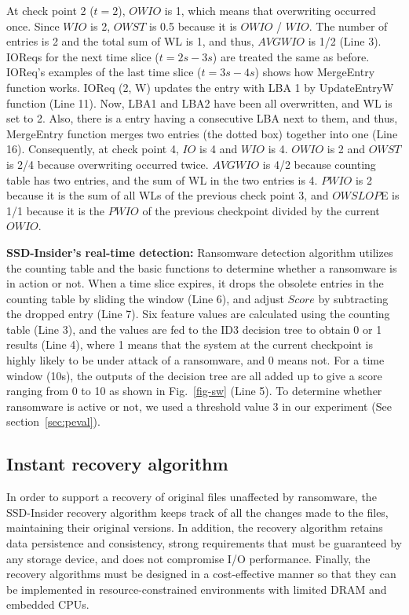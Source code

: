 \documentclass[conference]{IEEEtran}
\newcommand{\ours}{SSD-Insider}
\begin{document}
At check point 2 ($t=2$), $OWIO$ is 1, which means that overwriting occurred once. 
Since $WIO$ is 2, $OWST$ is 0.5 because it is $OWIO$ / $WIO$. 
The number of entries is 2 and the total sum of WL is 1, and thus, $AVGWIO$ is 1/2 (Line 3). 
IOReqs for the next time slice ($t=2s-3s$) are treated the same as before. 
IOReq's examples of the last time slice ($t=3s-4s$) shows how MergeEntry function works.
IOReq (2, W) updates the entry with LBA 1 by UpdateEntryW function (Line 11). 
Now, LBA1 and LBA2 have been all overwritten, and WL is set to 2. 
Also, there is a entry having a consecutive LBA next to them, and thus,
MergeEntry function merges two entries (the dotted box) together into one (Line 16).
Consequently, at check point 4, $IO$ is 4 and $WIO$ is 4. $OWIO$ is 2 and $OWST$ is 2/4 because overwriting occurred twice. $AVGWIO$ is 4/2 because counting table has two entries,
and the sum of WL in the two entries is 4. $PWIO$ is 2 because it is the sum of 
all WLs of the previous check point 3, and $OWSLOP$E is 1/1 because it is the $PWIO$ of 
the previous checkpoint divided by the current $OWIO$.

{\bf \ours{}'s real-time detection:} Ransomware detection algorithm utilizes
the counting table and the basic functions to determine whether a ransomware is in action or not. 
When a time slice expires, 
it drops the obsolete entries in the counting table by sliding the window (Line 6),
and adjust $Score$ by subtracting the dropped entry (Line 7).
Six feature values are calculated using the counting table (Line 3),
and the values are fed to the ID3 decision tree to obtain 0 or 1 results (Line 4),
where 1 means that the system at the current checkpoint is highly likely to be under attack
of a ransomware, and 0 means not. For a time window (10s), the outputs of the decision tree are all added up to 
give a score ranging from 0 to 10 as shown in Fig.~\ref{fig-sw} (Line 5). 
To determine whether ransomware is active or not, we used
a threshold value 3 in our experiment (See section~\ref{sec:peval}).



\subsection{Instant recovery algorithm}

\label{sec:recovery}
In order to support a recovery of original files unaffected by
ransomware, the \ours{} recovery algorithm keeps track of all
the changes made to the files, maintaining their original versions.
In addition, the recovery algorithm retains data persistence and
consistency, strong requirements that must be guaranteed by any
storage device, and does not compromise I/O performance.  Finally,
the recovery algorithms must be designed in a cost-effective manner
so that they can be implemented in resource-constrained
environments with limited DRAM and embedded CPUs.  
\end{document}
